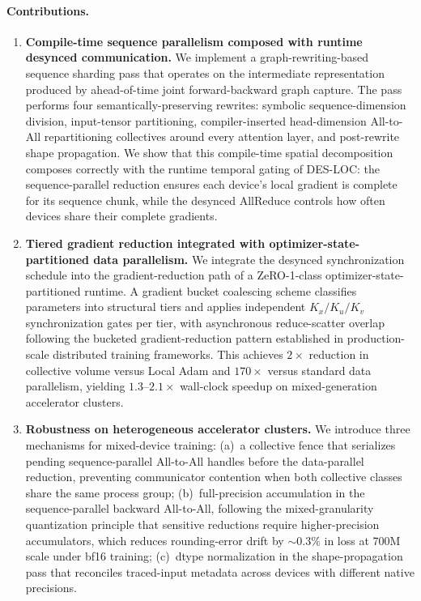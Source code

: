 \documentclass{article}
\begin{document}
\paragraph{Contributions.}
\begin{enumerate}
    \item \textbf{Compile-time sequence parallelism composed with runtime desynced communication.}
    We implement a graph-rewriting-based sequence sharding pass that operates on the
    intermediate representation produced by ahead-of-time joint forward-backward graph capture.
    The pass performs four semantically-preserving rewrites: symbolic sequence-dimension division,
    input-tensor partitioning, compiler-inserted head-dimension All-to-All repartitioning
    collectives around every attention layer, and post-rewrite shape propagation.
    We show that this compile-time spatial decomposition composes correctly with the
    runtime temporal gating of DES-LOC: the sequence-parallel reduction ensures each
    device's local gradient is complete for its sequence chunk, while the desynced
    AllReduce controls how often devices share their complete gradients.

    \item \textbf{Tiered gradient reduction integrated with optimizer-state-partitioned data parallelism.}
    We integrate the desynced synchronization schedule into the gradient-reduction path of a
    ZeRO-1-class optimizer-state-partitioned runtime. A gradient bucket coalescing scheme
    classifies parameters into structural tiers and applies independent $K_x / K_u / K_v$
    synchronization gates per tier, with asynchronous reduce-scatter overlap following the
    bucketed gradient-reduction pattern established in production-scale distributed training
    frameworks. This achieves $2\times$ reduction in collective volume versus Local Adam and
    $170\times$ versus standard data parallelism, yielding $1.3$--$2.1\times$ wall-clock speedup
    on mixed-generation accelerator clusters.

    \item \textbf{Robustness on heterogeneous accelerator clusters.}
    We introduce three mechanisms for mixed-device training:
    (a)~a collective fence that serializes pending sequence-parallel All-to-All handles before the
    data-parallel reduction, preventing communicator contention when both collective classes share
    the same process group;
    (b)~full-precision accumulation in the sequence-parallel backward All-to-All, following the
    mixed-granularity quantization principle that sensitive reductions require higher-precision
    accumulators, which reduces rounding-error drift by ${\sim}0.3\%$ in loss at 700M scale under
    bf16 training;
    (c)~dtype normalization in the shape-propagation pass that reconciles traced-input metadata
    across devices with different native precisions.


\end{enumerate}
\end{document}
